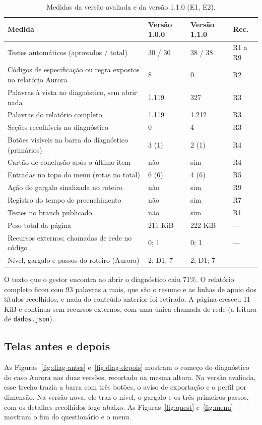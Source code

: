 \documentclass[11pt,a4paper]{article}
\newcommand{\thead}[1]{\sffamily\bfseries\small #1}
\begin{document}
\begin{table}[H]
\centering\small
\caption{Medidas da versão avaliada e da versão 1.1.0 (E1, E2).}\label{tab:antesdepois}
\begin{tabularx}{\linewidth}{XL{2.3cm}L{2.3cm}L{1.4cm}}
\toprule
\thead{Medida} & \thead{Versão 1.0.0} & \thead{Versão 1.1.0} & \thead{Rec.} \\
\midrule
Testes automáticos (aprovados / total) & 30 / 30 & 38 / 38 & R1 a R9 \\
Códigos de especificação ou regra expostos no relatório Aurora & 8 & 0 & R2 \\
Palavras à vista no diagnóstico, sem abrir nada & 1.119 & 327 & R3 \\
Palavras do relatório completo & 1.119 & 1.212 & R3 \\
Seções recolhíveis no diagnóstico & 0 & 4 & R3 \\
Botões visíveis na barra do diagnóstico (primários) & 3 (1) & 2 (1) & R4 \\
Cartão de conclusão após o último item & não & sim & R4 \\
Entradas no topo do menu (rotas no total) & 6 (6) & 4 (6) & R5 \\
Ação do gargalo sinalizada no roteiro & não & sim & R9 \\
Registro do tempo de preenchimento & não & sim & R7 \\
Testes no branch publicado & não & sim & R1 \\
Peso total da página & 211 KiB & 222 KiB & --- \\
Recursos externos; chamadas de rede no código & 0; 1 & 0; 1 & --- \\
Nível, gargalo e passos do roteiro (Aurora) & 2; D1; 7 & 2; D1; 7 & --- \\
\bottomrule
\end{tabularx}
\end{table}

O texto que o gestor encontra ao abrir o diagnóstico caiu 71\%. O relatório completo ficou com 93 palavras a
mais, que são o resumo e as linhas de apoio dos títulos recolhidos, e nada do conteúdo anterior foi retirado. A página
cresceu 11 KiB e continua sem recursos externos, com uma única chamada de rede (a leitura de \texttt{dados.json}).

\subsection{Telas antes e depois}
As Figuras~\ref{fig:diag-antes} e~\ref{fig:diag-depois} mostram o começo do diagnóstico do caso Aurora nas duas
versões, recortado na mesma altura. Na versão avaliada, esse trecho trazia a barra com três botões, o aviso de
exportação e o perfil por dimensão. Na versão nova, ele traz o nível, o gargalo e os três primeiros passos, com os
detalhes recolhidos logo abaixo. As Figuras~\ref{fig:quest} e~\ref{fig:menu} mostram o fim do questionário e o menu.
\end{document}
